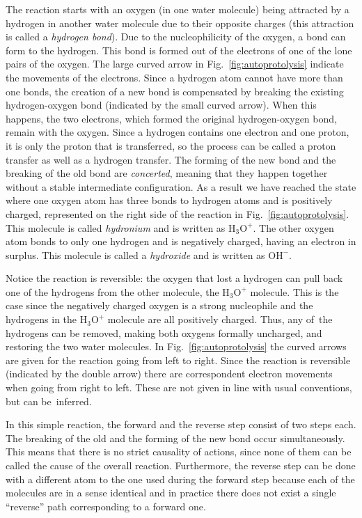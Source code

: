 \documentclass[runningheads]{llncs}
\begin{document}
The reaction
starts with an oxygen (in one water molecule) being attracted by a hydrogen in another 
water molecule due to their opposite
charges (this attraction is called a \emph{hydrogen bond}). Due to the nucleophilicity of 
the oxygen, a bond can form to the hydrogen. This bond is formed out of 
the electrons of one of the lone pairs of the oxygen. The large curved arrow in Fig.~\ref{fig:autoprotolysis} indicate the movements of the electrons. Since a hydrogen atom cannot have more 
than one bonds, 
the creation of a new bond is compensated by breaking the existing hydrogen-oxygen bond (indicated by the small curved arrow). When this happens, the two electrons, which formed the original hydrogen-oxygen bond, remain with the oxygen. Since a hydrogen contains %
one electron and one proton, it is only the proton that is transferred, so the process can be called a proton transfer as well as a hydrogen transfer. The forming of the new bond and the breaking of the old bond are \emph{concerted}, meaning that %
they happen together without a stable 
intermediate configuration. As a result we have reached the state where one oxygen atom
has three bonds to hydrogen atoms and is positively charged, represented on the right side of the reaction in %
 Fig.~\ref{fig:autoprotolysis}. This molecule is called \emph{hydronium} and is written as $\mathrm{H_3O^+}$. The other oxygen atom bonds to only one hydrogen and is negatively charged, having an 
electron in surplus. This molecule is called a \emph{hydroxide} and is written as $\mathrm{OH^-}$. 

Notice the reaction is reversible: the oxygen that lost a hydrogen can 
pull back one of the hydrogens from the other molecule, the  $\mathrm{H_3O^+}$ molecule. This is the case since the negatively 
charged oxygen is a strong nucleophile and the hydrogens in the $\mathrm{H_3O^+}$ molecule are 
all positively charged. Thus, any of~the hydrogens 
can be removed, making both oxygens formally uncharged, and restoring the two water 
molecules. In Fig.~\ref{fig:autoprotolysis} the curved arrows are given for the reaction going from left to right. Since the reaction is reversible (indicated by the double arrow) there are correspondent electron movements when going from right to left. These are not given in line with usual conventions, but can be~inferred.

In this simple reaction, the forward and the reverse step consist of two steps each. The breaking of the old and the forming of the new bond occur simultaneously. This means that there is no strict causality of actions, since none of them can be called the cause of the overall reaction. Furthermore, the reverse step can be done with a different atom to the one used during the forward step because each of the molecules are in a sense identical and in practice there does not exist a single ``reverse'' path corresponding to a forward one.%
\end{document}
